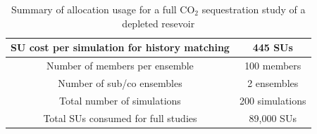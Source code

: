 \documentclass[a4paper,10pt]{article}
\begin{document}




\begin{table}[!h]
\begin{center}
 \caption{Summary of allocation usage for a full CO$_2$ sequestration study of a depleted resevoir}
\begin{tabular}{| c | c |}
\hline
SU cost per simulation for history matching& 445 SUs \\ 
\hline
Number of members per ensemble & 100 members \\ 
\hline
Number of sub/co ensembles & 2 ensembles \\ 
\hline
Total number of simulations & 200 simulations \\
\hline
Total SUs consumed for full studies & 89,000 SUs \\
\hline
\end{tabular}
\end{center}
\end{table}



\end{document}

